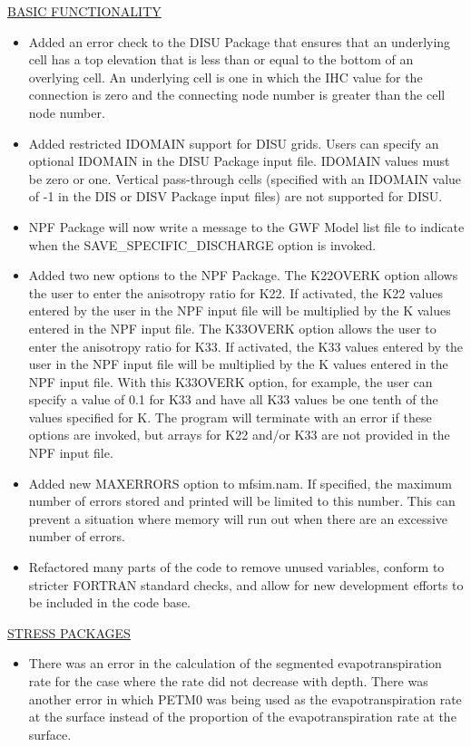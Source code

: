 \begin{itemize}
	\underline{BASIC FUNCTIONALITY}
	\begin{itemize}
		\item Added an error check to the DISU Package that ensures that an underlying cell has a top elevation that is less than or equal to the bottom of an overlying cell.  An underlying cell is one in which the IHC value for the connection is zero and the connecting node number is greater than the cell node number.
		\item Added restricted IDOMAIN support for DISU grids.  Users can specify an optional IDOMAIN in the DISU Package input file.  IDOMAIN values must be zero or one.  Vertical pass-through cells (specified with an IDOMAIN value of -1 in the DIS or DISV Package input files) are not supported for DISU.   
		\item NPF Package will now write a message to the GWF Model list file to indicate when the SAVE\_SPECIFIC\_DISCHARGE option is invoked.
		\item Added two new options to the NPF Package.  The K22OVERK option allows the user to enter the anisotropy ratio for K22.  If activated, the K22 values entered by the user in the NPF input file will be multiplied by the K values entered in the NPF input file.  The K33OVERK option allows the user to enter the anisotropy ratio for K33.  If activated, the K33 values entered by the user in the NPF input file will be multiplied by the K values entered in the NPF input file.  With this K33OVERK option, for example, the user can specify a value of 0.1 for K33 and have all K33 values be one tenth of the values specified for K.  The program will terminate with an error if these options are invoked, but arrays for K22 and/or K33 are not provided in the NPF input file.
		\item Added new MAXERRORS option to mfsim.nam.  If specified, the maximum number of errors stored and printed will be limited to this number.  This can prevent a situation where memory will run out when there are an excessive number of errors.
		\item Refactored many parts of the code to remove unused variables, conform to stricter FORTRAN standard checks, and allow for new development efforts to be included in the code base.
	\end{itemize}
	
	\underline{STRESS PACKAGES}
	\begin{itemize}
		\item There was an error in the calculation of the segmented evapotranspiration rate for the case where the rate did not decrease with depth.  There was another error in which PETM0 was being used as the evapotranspiration rate at the surface instead of the proportion of the evapotranspiration rate at the surface.
	\end{itemize}
	

\end{itemize}
